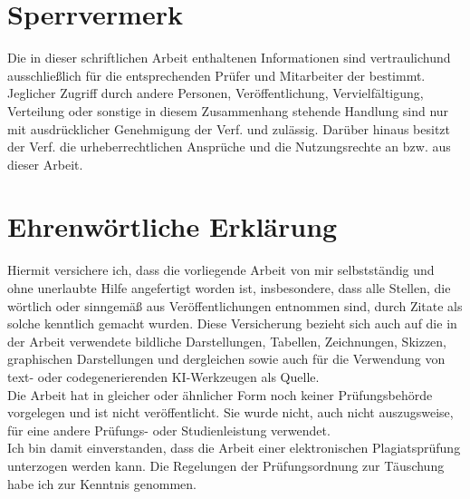 \documentclass[a4paper, 11pt, german ]{article}
\def\True{1}
\begin{document}
\newpage
{}
\tableofcontents




\if\Sperrvermerk \True
\newpage
 \section*{Sperrvermerk}
 Die in dieser schriftlichen Arbeit enthaltenen Informationen sind vertraulichund ausschließlich
 für die entsprechenden Prüfer und Mitarbeiter der \Hochschulname bestimmt.
Jeglicher Zugriff durch andere Personen, Veröffentlichung, Vervielfältigung,
Verteilung oder sonstige in diesem Zusammenhang stehende Handlung sind nur mit ausdrücklicher
Genehmigung der Verf. und \Firma\space zulässig. Darüber hinaus besitzt der
Verf. die urheberrecht\-lichen Ansprüche und \Firma\space die Nutzungsrechte
an bzw. aus dieser Arbeit.
\newpage
\fi




\if\Makefile\True
  
  
  
\else
  
  
  
  
\fi

\printbibliography


\newpage
\section*{Ehrenwörtliche Erklärung}
Hiermit versichere ich, dass die vorliegende Arbeit von mir selbstständig und ohne unerlaubte Hilfe
angefertigt worden ist, insbesondere, dass alle Stellen, die wörtlich oder sinngemäß aus
Veröffentlichungen entnommen sind, durch Zitate als solche kenntlich gemacht wurden.
Diese Versicherung bezieht sich auch auf die in der Arbeit verwendete bildliche Darstellungen,
Tabellen, Zeichnungen, Skizzen, graphischen Darstellungen und dergleichen sowie auch für die
Verwendung von text- oder codegenerierenden KI-Werkzeugen als Quelle.
\vspace{1ex}\\
Die Arbeit hat in gleicher oder ähnlicher Form noch keiner Prüfungsbehörde vorgelegen und ist nicht
veröffentlicht. Sie wurde nicht, auch nicht auszugsweise, für eine andere Prüfungs- oder
Studienleistung verwendet.
\vspace{1ex}\\
Ich bin damit einverstanden, dass die Arbeit einer elektronischen Plagiatsprüfung unterzogen werden
kann. Die Regelungen der Prüfungsordnung zur Täuschung habe ich zur Kenntnis genommen.


%
%
\end{document}
